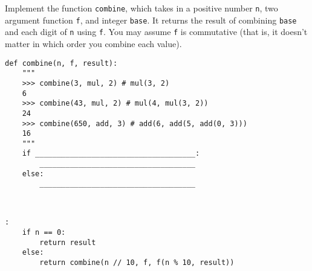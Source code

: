 \begin{blocksection}
\question Implement the function \texttt{combine}, which takes in a positive number \texttt{n}, two argument function \texttt{f}, and integer \texttt{base}. It returns the result of combining \texttt{base} and each digit of \texttt{n} using \texttt{f}. You may assume \texttt{f} is commutative (that is, it doesn't matter in which order you combine each value). \\

\begin{lstlisting}
def combine(n, f, result):
    """
    >>> combine(3, mul, 2) # mul(3, 2)
    6
    >>> combine(43, mul, 2) # mul(4, mul(3, 2))
    24
    >>> combine(650, add, 3) # add(6, add(5, add(0, 3)))
    16
    """
    if _____________________________________:
        ____________________________________
    else:
        ____________________________________

				
\end{lstlisting}

\begin{solution}[1in]
\begin{lstlisting}:
    if n == 0:
        return result
    else:
        return combine(n // 10, f, f(n % 10, result))
\end{lstlisting}
\end{solution}
\end{blocksection}
